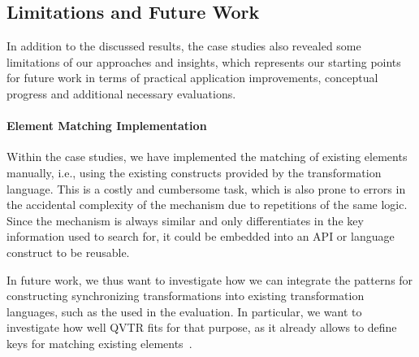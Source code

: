 \subsection{Limitations and Future Work}
\label{chap:correctness_evaluation:categorization:limitations}

In addition to the discussed results, the case studies also revealed some limitations of our approaches and insights, which represents our starting points for future work in terms of practical application improvements, conceptual progress and additional necessary evaluations.


\paragraph{Element Matching Implementation}
Within the case studies, we have implemented the matching of existing elements manually, i.e., using the existing constructs provided by the transformation language.
This is a costly and cumbersome task, which is also prone to errors in the accidental complexity of the mechanism due to repetitions of the same logic.
Since the mechanism is always similar and only differentiates in the key information used to search for, it could be embedded into an API or language construct to be reusable.

In future work, we thus want to investigate how we can integrate the patterns for constructing synchronizing transformations into existing transformation languages, such as the \reactionslanguage used in the evaluation.
In particular, we want to investigate how well \gls{QVTR} fits for that purpose, as it already allows to define keys for matching existing elements~\cite[7.10.2.]{qvt}. %

